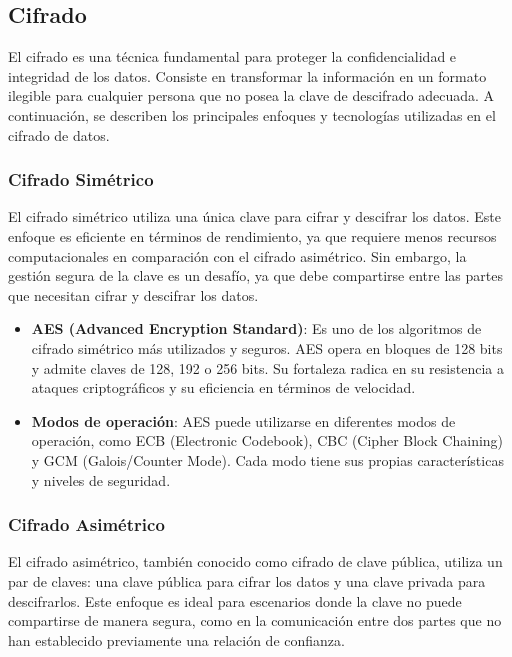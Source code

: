 \documentclass[draft]{scrbook}
\begin{document}
\subsection{Cifrado}
\label{subsec:cifrado}

El cifrado es una técnica fundamental para proteger la confidencialidad e integridad de los datos. Consiste en transformar la información en un formato ilegible para cualquier persona que no posea la clave de descifrado adecuada. A continuación, se describen los principales enfoques y tecnologías utilizadas en el cifrado de datos.

\subsubsection{Cifrado Simétrico}

El cifrado simétrico utiliza una única clave para cifrar y descifrar los datos. Este enfoque es eficiente en términos de rendimiento, ya que requiere menos recursos computacionales en comparación con el cifrado asimétrico. Sin embargo, la gestión segura de la clave es un desafío, ya que debe compartirse entre las partes que necesitan cifrar y descifrar los datos.

\begin{itemize}
    \item \textbf{AES (Advanced Encryption Standard)}: Es uno de los algoritmos de cifrado simétrico más utilizados y seguros. AES opera en bloques de 128 bits y admite claves de 128, 192 o 256 bits. Su fortaleza radica en su resistencia a ataques criptográficos y su eficiencia en términos de velocidad.
    \item \textbf{Modos de operación}: AES puede utilizarse en diferentes modos de operación, como ECB (Electronic Codebook), CBC (Cipher Block Chaining) y GCM (Galois/Counter Mode). Cada modo tiene sus propias características y niveles de seguridad.
\end{itemize}

\subsubsection{Cifrado Asimétrico}

El cifrado asimétrico, también conocido como cifrado de clave pública, utiliza un par de claves: una clave pública para cifrar los datos y una clave privada para descifrarlos. Este enfoque es ideal para escenarios donde la clave no puede compartirse de manera segura, como en la comunicación entre dos partes que no han establecido previamente una relación de confianza.
\end{document}

